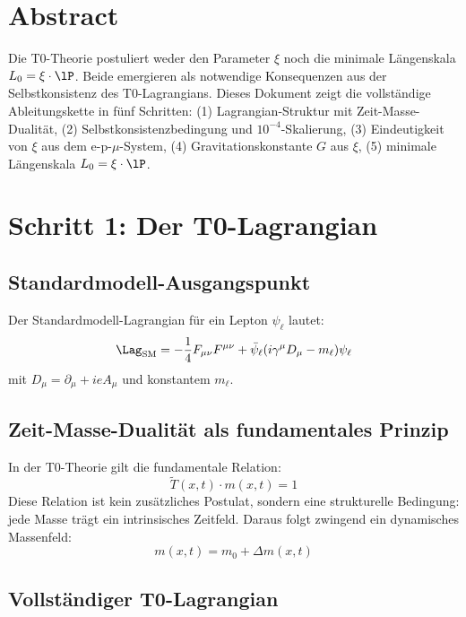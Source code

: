 \section*{Abstract}

Die T0-Theorie postuliert weder den Parameter $\xi$ noch die minimale Längenskala $L_0 = \xi \cdot \lP$. Beide emergieren als notwendige Konsequenzen aus der Selbstkonsistenz des T0-Lagrangians. Dieses Dokument zeigt die vollständige Ableitungskette in fünf Schritten: (1) Lagrangian-Struktur mit Zeit-Masse-Dualität, (2) Selbstkonsistenzbedingung und $10^{-4}$-Skalierung, (3) Eindeutigkeit von $\xi$ aus dem e-p-$\mu$-System, (4) Gravitationskonstante $G$ aus $\xi$, (5) minimale Längenskala $L_0 = \xi \cdot \lP$.

\section{Schritt 1: Der T0-Lagrangian}

\subsection{Standardmodell-Ausgangspunkt}

Der Standardmodell-Lagrangian für ein Lepton $\psi_\ell$ lautet:
\begin{equation}
	\Lag_{\text{SM}} = -\frac{1}{4} F_{\mu\nu}F^{\mu\nu} + \bar{\psi}_\ell(i\gamma^\mu D_\mu - m_\ell)\psi_\ell
	\label{eq:sm_lagrangian}
\end{equation}
mit $D_\mu = \partial_\mu + ieA_\mu$ und konstantem $m_\ell$.

\subsection{Zeit-Masse-Dualität als fundamentales Prinzip}

In der T0-Theorie gilt die fundamentale Relation:
\begin{equation}
	\tilde{T}(x,t) \cdot m(x,t) = 1
	\label{eq:duality}
\end{equation}
Diese Relation ist kein zusätzliches Postulat, sondern eine strukturelle Bedingung: jede Masse trägt ein intrinsisches Zeitfeld. Daraus folgt zwingend ein dynamisches Massenfeld:
\begin{equation}
	m(x,t) = m_0 + \Delta m(x,t)
\end{equation}

\subsection{Vollständiger T0-Lagrangian}

